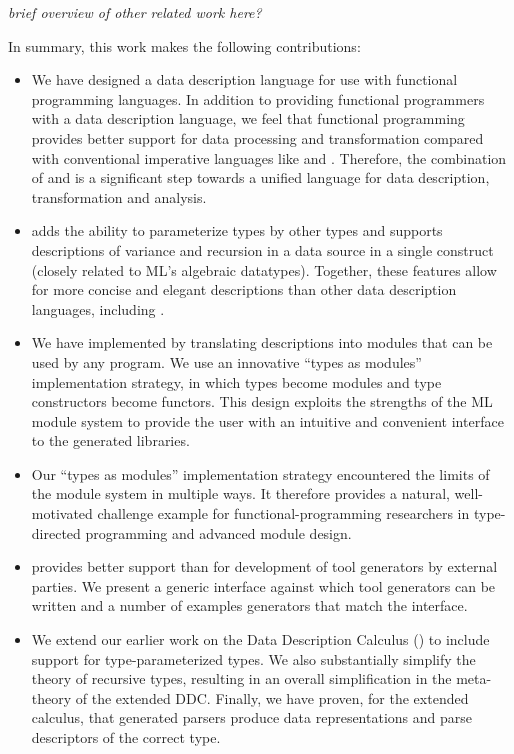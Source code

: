 \emph{brief overview of other related work here?}

In summary, this work makes the following contributions:
\begin{itemize}
\item We have designed a data description language for use with
  functional programming languages. In addition to providing
  functional programmers with a data description language, we
  feel that functional programming provides better support for data
  processing and transformation compared with conventional imperative
  languages like \C{} and \java{}. Therefore, the combination of
  \padsml{} and \ocaml{} is a significant step towards a unified
  language for data description, transformation and analysis.
\item \padsml{} adds the ability to parameterize types by other types
  and supports descriptions of variance and recursion in a data source
  in a single construct (closely related to ML's algebraic datatypes).
  Together, these features allow for more concise and elegant
  descriptions than other data description languages, including
  \padsc{}.
\item We have implemented \padsml{} by translating descriptions into
  \ocaml{} modules that can be used by any \ocaml{} program. We use an
  innovative ``types as modules'' implementation strategy, in which
  \padsml{} types become modules and \padsml{} type constructors
  become functors. This design exploits the strengths of the ML module
  system to provide the user with an intuitive and convenient
  interface to the generated libraries.
\item Our ``types as modules'' implementation strategy encountered the
  limits of the \ocaml{} module system in multiple ways. It therefore
  provides a natural, well-motivated challenge example for
  functional-programming researchers in type-directed programming and
  advanced module design.
\item \padsml{} provides better support than \padsc{} for development of tool
  generators by external parties. We present a generic interface
  against which tool generators can be written and a number of
  examples generators that match the interface.
\item We extend our earlier work on the Data Description Calculus
  (\ddcold{}) to include support for type-parameterized types. We also
  substantially simplify the theory of recursive types, resulting in
  an overall simplification in the meta-theory of the extended DDC.
  Finally, we have proven, for the extended calculus, that generated
  parsers produce data representations and parse descriptors of the
  correct type.
\end{itemize}

